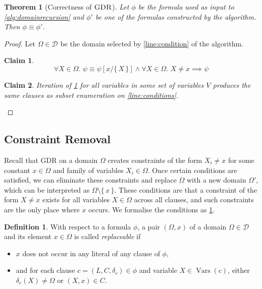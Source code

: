 \documentclass{article}
\newtheorem{theorem}{Theorem}
\newtheorem{claim}{Claim}
\theoremstyle{definition}
\newtheorem{definition}{Definition}
\DeclareMathOperator{\GDR}{\textsc{GDR}}
\DeclareMathOperator{\Vars}{Vars}
\begin{document}
\begin{theorem}[Correctness of $\GDR$]
  Let $\phi$ be the formula used as input to \cref{alg:domainrecursion} and
  $\phi'$ be one of the formulas constructed by the algorithm. Then
  $\phi \equiv \phi'$.
\end{theorem}
\begin{proof} %
  Let $\Omega \in \mathcal{D}$ be the domain selected by
  \cref{line:condition} of the algorithm.
  \begin{claim}\label{claim:logic}
  \[
    \forall X \in \Omega\text{. } \psi \equiv \psi[x/\{\, X \,\}] \land \forall X \in \Omega\text{. } X \ne x \implies \psi
  \]
  \end{claim}
  \begin{claim}
    Iteration of \cref{claim:logic} for all variables in some set of variables
    $V$ produces the same clauses as subset enumeration on
    \cref{line:conditions}.
  \end{claim}
\end{proof}

\subsection{Constraint Removal}\label{sec:cr}

Recall that GDR on a domain $\Omega$ creates constraints of the form $X_i \ne x$
for some constant $x \in \Omega$ and family of variables $X_i \in \Omega$. Once
certain conditions are satisfied, we can eliminate these constraints and replace
$\Omega$ with a new domain $\Omega'$, which can be interpreted as
$\Omega \setminus \{\, x \,\}$. These conditions are that a constraint of the
form $X \ne x$ exists for all variables $X \in \Omega$ across all clauses, and
such constraints are the only place where $x$ occurs. We formalise the
conditions as \cref{def:replaceable}.

\begin{definition}\label{def:replaceable}
  With respect to a formula $\phi$, a pair $(\Omega, x)$ of a domain
  $\Omega \in \mathcal{D}$ and its element $x \in \Omega$ is called
  \emph{replaceable} if
  \begin{itemize}
    \item $x$ does not occur in any literal of any clause of $\phi$,
    \item and for each clause $c = (L, C, \delta_c) \in \phi$ and variable
          $X \in \Vars(c)$, either $\delta_c(X) \ne \Omega$ or $(X, x) \in C$.
  \end{itemize}
\end{definition}
\end{document}
